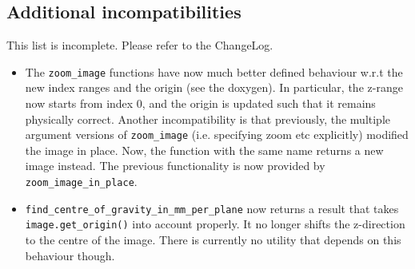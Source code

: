 \documentclass{article}
\begin{document}
\subsection{Additional incompatibilities}
This list is incomplete. Please refer to the ChangeLog.
\begin{itemize}
\item The \texttt{zoom\_image} functions have now much better defined behaviour
	w.r.t the new index ranges and the origin (see the doxygen). In particular,
	the z-range now starts from index 0, and the origin is updated such that
	it remains physically correct. Another incompatibility is that previously, 
	the multiple argument versions of \texttt{zoom\_image} (i.e. specifying zoom etc 
	explicitly) modified the image in place. Now, the function with the same name 
	returns a new image instead. The previous functionality is now provided by 
	\texttt{zoom\_image\_in\_place}.

\item \texttt{find\_centre\_of\_gravity\_in\_mm\_per\_plane} now returns a result that takes 
    \texttt{image.get\_origin()} into account properly. It no longer
    shifts the z-direction to the centre of the image. There is currently no
    utility that depends on this behaviour though.
\end{itemize}
\end{document}
